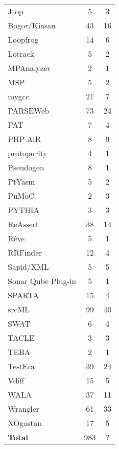 \begin{longtable}{ l c c }
   Jtop & 5 & 3 \\
   Bogor/Kiasan & 43 & 16 \\
   Loopfrog & 14 & 6 \\
   Lotrack & 5 & 2 \\
   MPAnalyzer & 2 & 1 \\
   MSP & 5 & 2 \\
   mygcc & 21 & 7 \\
   PARSEWeb & 73 & 24 \\
   PAT & 7 & 4 \\
   PHP AiR & 8 & 9 \\
   protopurity & 4 & 1 \\
   Pseudogen & 8 & 1 \\
   PtYasm & 5 & 2 \\
   PuMoC & 2 & 3 \\
   PYTHIA & 3 & 3 \\
   ReAssert & 38 & 14 \\
   Rêve & 5 & 1 \\
   RRFinder & 12 & 4 \\
   Sapid/XML & 5 & 5 \\
   Sonar Qube Plug-in & 5 & 1 \\
   SPARTA & 15 & 4 \\
   srcML & 99 & 40 \\
   SWAT & 6 & 4 \\
   TACLE & 3 & 3 \\
   TEBA & 2 & 1 \\
   TestEra & 39 & 24 \\
   Vdiff & 15 & 5 \\
   WALA & 37 & 11 \\
   Wrangler & 61 & 33 \\
   XOgastan & 17 & 5 \\
  \hline
  {\bf Total} & 983 & ? \\
\end{longtable}

